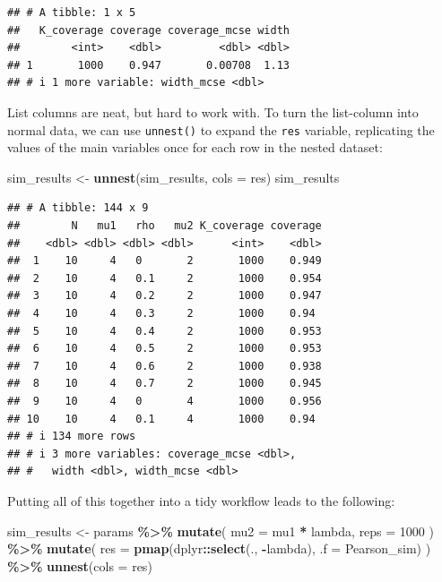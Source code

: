 \documentclass[
]{book}
\newenvironment{Shaded}{\begin{snugshade}}{\end{snugshade}}
\newcommand{\AttributeTok}[1]{\textcolor[rgb]{0.13,0.29,0.53}{#1}}
\newcommand{\DecValTok}[1]{\textcolor[rgb]{0.00,0.00,0.81}{#1}}
\newcommand{\FunctionTok}[1]{\textcolor[rgb]{0.13,0.29,0.53}{\textbf{#1}}}
\newcommand{\NormalTok}[1]{#1}
\newcommand{\OtherTok}[1]{\textcolor[rgb]{0.56,0.35,0.01}{#1}}
\newcommand{\SpecialCharTok}[1]{\textcolor[rgb]{0.81,0.36,0.00}{\textbf{#1}}}
\begin{document}
\begin{Shaded}
\end{Shaded}

\begin{verbatim}
## # A tibble: 1 x 5
##   K_coverage coverage coverage_mcse width
##        <int>    <dbl>         <dbl> <dbl>
## 1       1000    0.947       0.00708  1.13
## # i 1 more variable: width_mcse <dbl>
\end{verbatim}

List columns are neat, but hard to work with.
To turn the list-column into normal data, we can use \texttt{unnest()} to expand the \texttt{res} variable, replicating the values of the main variables once for each row in the nested dataset:

\begin{Shaded}
\begin{Highlighting}[]
\NormalTok{sim\_results }\OtherTok{\textless{}{-}} \FunctionTok{unnest}\NormalTok{(sim\_results, }\AttributeTok{cols =}\NormalTok{ res)}
\NormalTok{sim\_results}
\end{Highlighting}
\end{Shaded}

\begin{verbatim}
## # A tibble: 144 x 9
##        N   mu1   rho   mu2 K_coverage coverage
##    <dbl> <dbl> <dbl> <dbl>      <int>    <dbl>
##  1    10     4   0       2       1000    0.949
##  2    10     4   0.1     2       1000    0.954
##  3    10     4   0.2     2       1000    0.947
##  4    10     4   0.3     2       1000    0.94 
##  5    10     4   0.4     2       1000    0.953
##  6    10     4   0.5     2       1000    0.953
##  7    10     4   0.6     2       1000    0.938
##  8    10     4   0.7     2       1000    0.945
##  9    10     4   0       4       1000    0.956
## 10    10     4   0.1     4       1000    0.94 
## # i 134 more rows
## # i 3 more variables: coverage_mcse <dbl>,
## #   width <dbl>, width_mcse <dbl>
\end{verbatim}

Putting all of this together into a tidy workflow leads to the following:

\begin{Shaded}
\begin{Highlighting}[]
\NormalTok{sim\_results }\OtherTok{\textless{}{-}} 
\NormalTok{  params }\SpecialCharTok{\%\textgreater{}\%}
  \FunctionTok{mutate}\NormalTok{(}
    \AttributeTok{mu2 =}\NormalTok{ mu1 }\SpecialCharTok{*}\NormalTok{ lambda,}
    \AttributeTok{reps =} \DecValTok{1000}
\NormalTok{  ) }\SpecialCharTok{\%\textgreater{}\%}
  \FunctionTok{mutate}\NormalTok{(}
    \AttributeTok{res =} \FunctionTok{pmap}\NormalTok{(dplyr}\SpecialCharTok{::}\FunctionTok{select}\NormalTok{(., }\SpecialCharTok{{-}}\NormalTok{lambda), }\AttributeTok{.f =}\NormalTok{ Pearson\_sim)}
\NormalTok{  ) }\SpecialCharTok{\%\textgreater{}\%}
  \FunctionTok{unnest}\NormalTok{(}\AttributeTok{cols =}\NormalTok{ res)}
\end{Highlighting}
\end{Shaded}
\end{document}
